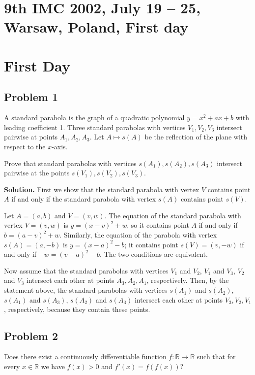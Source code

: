 \documentclass{article}
\begin{document}
\pagestyle{plain}

\section*{9th IMC 2002, July 19 -- 25, Warsaw, Poland, First day}

\section*{First Day}

\subsection*{Problem 1}
A standard parabola is the graph of a quadratic polynomial $y = x^2 + ax + b$ with leading coefficient 1.
Three standard parabolas with vertices $V_1, V_2, V_3$ intersect pairwise at points $A_1, A_2, A_3$.
Let $A \mapsto s(A)$ be the reflection of the plane with respect to the $x$-axis.

Prove that standard parabolas with vertices $s(A_1), s(A_2), s(A_3)$ intersect pairwise at the points
$s(V_1), s(V_2), s(V_3)$.

\textbf{Solution.}
First we show that the standard parabola with vertex $V$ contains point $A$
if and only if the standard parabola with vertex $s(A)$ contains point $s(V)$.

Let $A = (a, b)$ and $V = (v, w)$. The equation of the standard parabola with vertex $V = (v, w)$
is $y = (x - v)^2 + w$, so it contains point $A$ if and only if $b = (a - v)^2 + w$.
Similarly, the equation of the parabola with vertex $s(A) = (a, -b)$ is $y = (x - a)^2 - b$;
it contains point $s(V) = (v, -w)$ if and only if $-w = (v - a)^2 - b$.
The two conditions are equivalent.

Now assume that the standard parabolas with vertices $V_1$ and $V_2$, $V_1$ and $V_3$,
$V_2$ and $V_3$ intersect each other at points $A_3, A_2, A_1$, respectively.
Then, by the statement above, the standard parabolas with vertices $s(A_1)$ and $s(A_2)$, $s(A_1)$
and $s(A_3)$, $s(A_2)$ and $s(A_3)$ intersect each other at points $V_3, V_2, V_1$, respectively,
because they contain these points.

\subsection*{Problem 2}
Does there exist a continuously differentiable function
$f : \mathbb{R} \to \mathbb{R}$ such that for every $x \in \mathbb{R}$
we have $f(x) > 0$ and $f'(x) = f(f(x))$?
\end{document}

